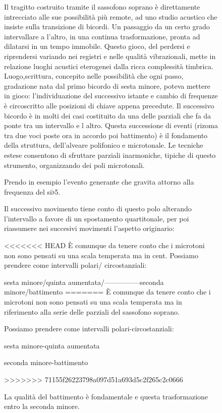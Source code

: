 \begin{figure}
Il tragitto costruito tramite il sassofono soprano è direttamente intrecciato alle sue
possibilità più remote, ad uno studio acustico che insiste sulla transizione di bicordi.
Un passaggio da un certo grado intervallare a l’altro, in una continua trasformazione,
pronta ad dilatarsi in un tempo immobile. Questo gioco, del perdersi e riprendersi
variando nei registri e nelle  qualità vibrazionali, mette in relazione luoghi
acustici eterogenei dalla ricca complessità timbrica.
Luogo,scrittura, concepito nelle possibilità che ogni passo, gradazione nata dal
primo bicordo di sesta minore, poteva mettere in gioco: l’individuazione del successivo
istante e cambio di frequenze è circoscritto alle posizioni di chiave appena precedute.
Il successivo bicordo è in molti dei casi costituito da una delle parziali che fa da
ponte tra un intervallo e l altro.
Questa successione di eventi (rizoma tra due voci poste ora in accordo poi battimento)
è il fondamento della struttura, dell’alveare polifonico e microtonale.
Le tecniche estese consentono di sfruttare parziali inarmoniche, tipiche di questo
strumento, organizzando dei poli microtonali.

Prendo in esempio l’evento generante che gravita attorno alla frequenza del si{\large$\flat$}5.

Il successivo movimento tiene conto di questo polo alterando l’intervallo a favore
di un spostamento quartitonale, per poi riassumere nei succesivi movimenti l’aspetto originario:

<<<<<<< HEAD
È comunque da tenere conto che i microtoni non sono pensati su una scala temperata ma in cent.
Possiamo prendere come intervalli polari/ circostanziali:

sesta minore/quinta aumentata/—————seconda minore/battimento
=======
È comunque da tenere conto che i microtoni non sono pensati su una scala temperata ma
in riferimento alla serie delle parziali del sassofono soprano. 

Possiamo prendere come intervalli polari-circostanziali:

\begin{center}
sesta minore-quinta aumentata
\end{center} 

\begin{center}
seconda minore-battimento 
\end{center} 
>>>>>>> 71155f26223798a097d51a693d5c2f265c2c0666

La qualità del battimento è fondamentale e questa trasformazione entro la seconda minore.


\end{figure}
